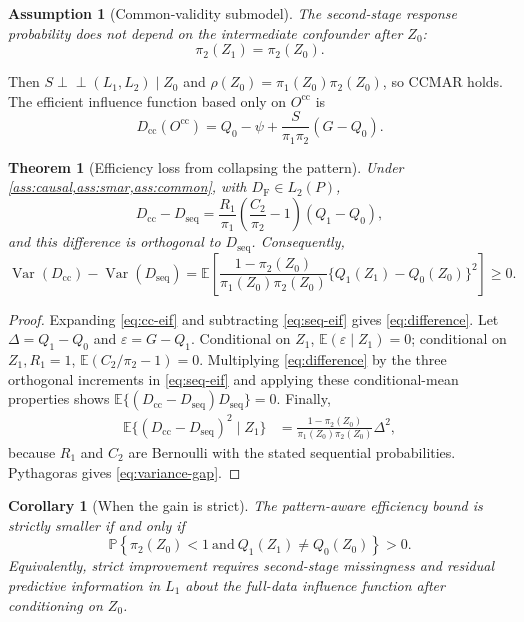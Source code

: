 \documentclass[11pt]{article}
\newtheorem{assumption}{Assumption}
\newtheorem{theorem}{Theorem}
\newtheorem{corollary}{Corollary}
\theoremstyle{definition}
\newcommand{\E}{\mathbb{E}}
\newcommand{\Pp}{\mathbb{P}}
\newcommand{\Var}{\operatorname{Var}}
\newcommand{\indep}{\perp\!\!\!\perp}
\newcommand{\1}{\mathbf{1}}
\newcommand{\cc}{\mathrm{cc}}
\newcommand{\seq}{\mathrm{seq}}
\newcommand{\F}{\mathrm{F}}
\begin{document}
\begin{assumption}[Common-validity submodel]\label{ass:common}
The second-stage response probability does not depend on the intermediate confounder after $Z_0$:
\[
\pi_2(Z_1)=\pi_2(Z_0).
\]
\end{assumption}

Then $S\indep(L_1,L_2)\mid Z_0$ and $\rho(Z_0)=\pi_1(Z_0)\pi_2(Z_0)$, so CCMAR
holds. The efficient influence function based only on $O^{\cc}$ is
\begin{equation}\label{eq:cc-eif}
D_{\cc}(O^{\cc})=Q_0-\psi+
\frac{S}{\pi_1\pi_2}(G-Q_0).
\end{equation}

\begin{theorem}[Efficiency loss from collapsing the pattern]\label{thm:gap}
Under \cref{ass:causal,ass:smar,ass:common}, with $D_{\F}\in L_2(P)$,
\begin{equation}\label{eq:difference}
D_{\cc}-D_{\seq}
=\frac{R_1}{\pi_1}\left(\frac{C_2}{\pi_2}-1\right)(Q_1-Q_0),
\end{equation}
and this difference is orthogonal to $D_{\seq}$. Consequently,
\begin{equation}\label{eq:variance-gap}
\boxed{
\Var(D_{\cc})-\Var(D_{\seq})
=\E\!\left[
\frac{1-\pi_2(Z_0)}{\pi_1(Z_0)\pi_2(Z_0)}
\{Q_1(Z_1)-Q_0(Z_0)\}^2
\right]\ge0.}
\end{equation}
\end{theorem}

\begin{proof}
Expanding \cref{eq:cc-eif} and subtracting \cref{eq:seq-eif} gives \cref{eq:difference}. Let $\Delta=Q_1-Q_0$ and $\varepsilon=G-Q_1$. Conditional on $Z_1$, $\E(\varepsilon\mid Z_1)=0$; conditional on $Z_1,R_1=1$, $\E(C_2/\pi_2-1)=0$. Multiplying \cref{eq:difference} by the three orthogonal increments in \cref{eq:seq-eif} and applying these conditional-mean properties shows
$\E\{(D_{\cc}-D_{\seq})D_{\seq}\}=0$. Finally,
\begin{align*}
\E\{(D_{\cc}-D_{\seq})^2\mid Z_1\}
&=\frac{1-\pi_2(Z_0)}{\pi_1(Z_0)\pi_2(Z_0)}\Delta^2,
\end{align*}
because $R_1$ and $C_2$ are Bernoulli with the stated sequential probabilities. Pythagoras gives \cref{eq:variance-gap}.
\end{proof}

\begin{corollary}[When the gain is strict]\label{cor:strict}
The pattern-aware efficiency bound is strictly smaller if and only if
\[
\Pp\!\left\{\pi_2(Z_0)<1\ \text{and}\ Q_1(Z_1)\ne Q_0(Z_0)\right\}>0.
\]
Equivalently, strict improvement requires second-stage missingness and residual predictive information in $L_1$ about the full-data influence function after conditioning on $Z_0$.
\end{corollary}
\end{document}
